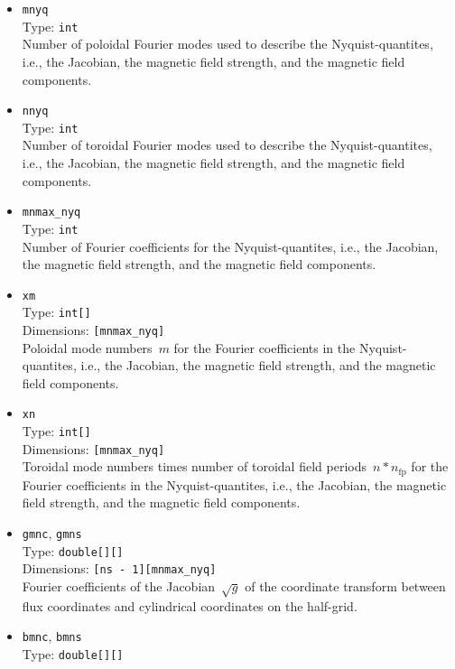 \begin{itemize}
 \item \texttt{mnyq} \\
       Type: \texttt{int} \\
       Number of poloidal Fourier modes used to describe the Nyquist-quantites,
       i.e., the Jacobian, the magnetic field strength, and the magnetic field components.
 \item \texttt{nnyq} \\
       Type: \texttt{int} \\
       Number of toroidal Fourier modes used to describe the Nyquist-quantites,
       i.e., the Jacobian, the magnetic field strength, and the magnetic field components.
 \item \texttt{mnmax\_nyq} \\
       Type: \texttt{int} \\
       Number of Fourier coefficients for the Nyquist-quantites,
       i.e., the Jacobian, the magnetic field strength, and the magnetic field components.
 \item \texttt{xm} \\
       Type: \texttt{int[]} \\
       Dimensions: \texttt{[mnmax\_nyq]} \\
       Poloidal mode numbers~$m$ for the Fourier coefficients in the Nyquist-quantites,
       i.e., the Jacobian, the magnetic field strength, and the magnetic field components.
 \item \texttt{xn} \\
       Type: \texttt{int[]} \\
       Dimensions: \texttt{[mnmax\_nyq]} \\
       Toroidal mode numbers times number of toroidal field periods~$n * n_\textrm{fp}$
       for the Fourier coefficients in the Nyquist-quantites,
       i.e., the Jacobian, the magnetic field strength, and the magnetic field components.
 \item \texttt{gmnc}, \texttt{gmns} \\
       Type: \texttt{double[][]} \\
       Dimensions: \texttt{[ns - 1][mnmax\_nyq]} \\
       Fourier coefficients of the Jacobian~$\sqrt{g}$ of the coordinate transform between flux coordinates
       and cylindrical coordinates on the half-grid.
 \item \texttt{bmnc}, \texttt{bmns} \\
       Type: \texttt{double[][]} \\

\end{itemize}
